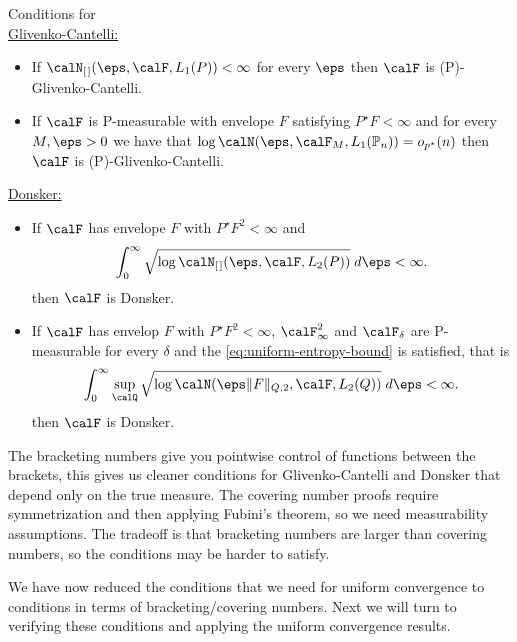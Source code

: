 \begin{remark*}
	Conditions for \\
	\underline{Glivenko-Cantelli:}	
	\begin{itemize}
		\item If \(\calN_{[\hspace{0.1em}]}(\eps,\calF,L_1(P))<\infty\) for every \(\eps\) then \(\calF\) is (P)-Glivenko-Cantelli.
		\item If \(\calF\) is P-measurable with envelope \(F\) satisfying \(P^\star F <\infty\) and for every \(M,\eps > 0\) we have that \(\log\calN(\eps,\calF_M,L_1(\P_n)) = o_{p^\star}(n)\) then \(\calF\) is (P)-Glivenko-Cantelli.
	\end{itemize}
	\underline{Donsker:}
	\begin{itemize}
		\item If \(\calF\) has envelope \(F\) with \(P^\star F^2 <\infty\) and 
			\[
				\int_{0}^{\infty} \sqrt{\log\calN_{[\hspace{0.1em}]}(\eps,\calF,L_2(P))}\;d\eps <\infty  
			.\] 
			then \(\calF\) is Donsker. 
		\item If \(\calF\) has envelop \(F\) with \(P^\star F^2 <\infty\), \(\calF_\infty^2\) and \(\calF_\delta\) are P-measurable for every \(\delta\) and the \eqref{eq:uniform-entropy-bound} is satisfied, that is 
		\[
			\int_{0}^{\infty} \sup_\calQ \sqrt{\log\calN(\eps\|F\|_{Q,2},\calF,L_2(Q))}\;d\eps < \infty
		.\]
		then \(\calF\) is Donsker.
	\end{itemize}
	The bracketing numbers give you pointwise control of functions between the brackets, this gives us cleaner conditions for Glivenko-Cantelli and Donsker that depend only on the true measure. The covering number proofs require symmetrization and then applying Fubini's theorem, so we need measurability assumptions. The tradeoff is that bracketing numbers are larger than covering numbers, so the conditions may be harder to satisfy.
\end{remark*}

We have now reduced the conditions that we need for uniform convergence to conditions in terms of bracketing/covering numbers. Next we will turn to verifying these conditions and applying the uniform convergence results. 
